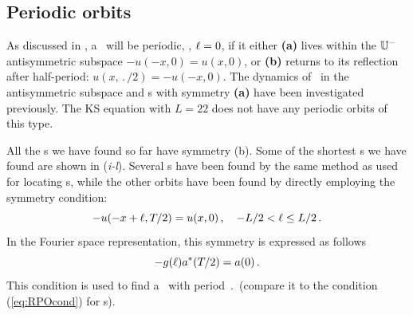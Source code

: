 \subsection{Periodic orbits} \label{ssec:po}
As discussed in , a \rpo\ will be periodic, \ie,
$\ell = 0$, if it either {\bf (a)} lives within the
 $\mathbb{U}^-$ antisymmetric
subspace $-u(-x,0) = u(x,0)$, or {\bf (b)} returns to its reflection
after half-period: $u(x,\period{}/2)=-u(-x,0)$.  The dynamics of
\KSe\ in the antisymmetric subspace and \po s with symmetry {\bf (a)} have
been investigated
previously. The KS equation
with $L = 22$ does not have any periodic orbits of this type.


All the \po s we have found so far have symmetry (b).
Some of the shortest \po s we have found are shown in
(\textit{i-l}).  Several \po s have been found by the same
method as used for locating \rpo s, while the other orbits have been
found by directly employing the symmetry condition:
\[ -u(-x+\ell,{T_{}}/2) = u(x,0)\,, \quad -L/2 < \ell \leq L/2\,.\]
In the Fourier space representation, this symmetry is expressed as
follows
\[ -g(\ell)a^\ast({T_{}}/2) = a(0)\,. \]
This condition is used to find a \po\ with period $\period{}$
(compare it to the condition (\ref{eq:RPOcond}) for \rpo s).


